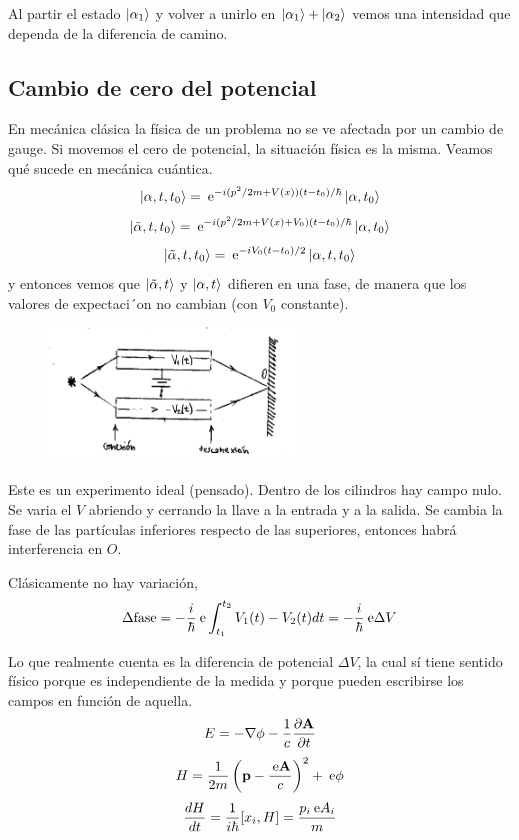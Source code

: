 \documentclass[10pt,oneside]{CBFT_book}
\begin{document}
Al partir el estado $\Ket{\alpha_1} $ y volver a unirlo en $\Ket{\alpha_1} + \Ket{\alpha_2}$ vemos una intensidad que 
dependa de la diferencia de camino.

\subsection{Cambio de cero del potencial}

En mecánica clásica la física de un problema no se ve afectada por un cambio de gauge.
Si movemos el cero de potencial, la situación física es la misma.
Veamos qué sucede en mecánica cuántica.
\[
	\Ket{\alpha,t,t_0} = \:\mathrm{e}^{ -i (p^2/2m + V(x))(t-t_0)/\hbar} \Ket{\alpha,t_0}
\]
\[
	\Ket{\tilde{\alpha},t,t_0} = \:\mathrm{e}^{ -i (p^2/2m + V(x) + V_0)(t-t_0)/\hbar} \Ket{\alpha,t_0}
\]
\[
	\Ket{\tilde{\alpha},t,t_0} = \:\mathrm{e}^{ -i V_0(t-t_0)/2 }\Ket{\alpha,t,t_0}
\]
y entonces vemos que $\Ket{\tilde{\alpha},t}$ y $\Ket{\alpha,t}$ difieren en una fase, de manera que los valores de 
expectaci´on no cambian (con $V_0$ constante).

\begin{figure}[htb]
	\begin{center}
	\includegraphics[width=0.6\textwidth]{images/teo2_7.pdf}	 
	\end{center}
	\caption{}
\end{figure} 

Este es un experimento ideal (pensado). Dentro de los cilindros hay campo nulo. Se varia el $V$ abriendo y cerrando la 
llave a la entrada y a la salida.
Se cambia la fase de las partículas inferiores respecto de las superiores, entonces habrá interferencia en $O$.

Clásicamente no hay variación,
\[
	\Delta \text{fase} = -\frac{i}{\hbar}\:\mathrm{e} \int _{t_1}^{t_2} V_1(t) - V_2(t) dt = 
	-\frac{i}{\hbar}\:\mathrm{e} \Delta V
\]

Lo que realmente cuenta es la diferencia de potencial $\Delta V$, la cual sí tiene sentido físico porque es 
independiente de la medida y porque pueden escribirse los campos en función de aquella.
\[
	E = - \Nabla\phi - \frac{1}{c}\dpar{\vb{A}}{t}
\]
\[
	H = \frac{1}{2m} \left( \vb{p} - \frac{\euler\vb{A}}{c}\right)^2 + \euler\phi 
\]
\[
	\frac{d^{\hspace{-0.05em}} {H}}{d {t}^{\hspace{-0.05em}}} = \frac{1}{i\hbar}[x_i,H] = \frac{p_i  \:\mathrm{e} A_i}{m}
\]
\end{document}
